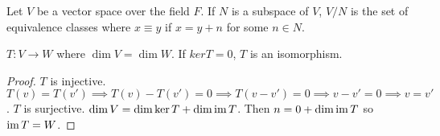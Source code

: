 \documentclass[10pt]{article}
\begin{document}
\begin{note}
	Let $V$ be a vector space over the field $F$. If $N$ is a subspace of $V$, $V
	/ N$ is the set of equivalence classes where $x \equiv y$ if $x = y + n$ for
	some $n \in N$.
\end{note}

\begin{note}
	\begin{theorem}
	$T: V \to W$ where $\dim V = \dim W$. If $ker T = 0$, $T$ is an isomorphism. 
	\end{theorem}
		\begin{proof}
	$T$ is injective. $T(v) = T(v') \implies T(v) - T(v') = 0 \implies T(v - v') = 0 \implies v - v' = 0 \implies v = v'$.
	$T$ is surjective. $\dim V =  \dim \ker T + \dim \operatorname{im} T$. Then $n = 0 + \dim \operatorname{im} T$ so $\operatorname{im} T = W$.
		\end{proof}
\end{note}
	
\end{document}
